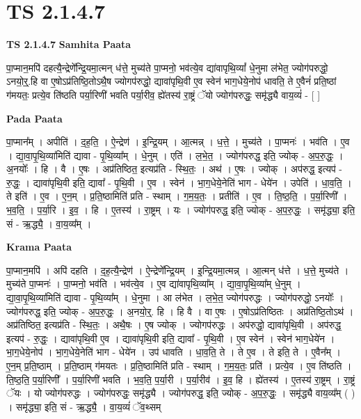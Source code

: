 \documentclass[17pt]{extarticle}
\begin{document}
\section*{ TS 2.1.4.7 }

\textbf{TS 2.1.4.7 } \newline
\textbf{Samhita Paata} \newline

पा॒प्मान॒मपि॑ दहत्यै॒न्द्रेणे᳚न्द्रि॒यमा॒त्मन् ध॑त्ते॒ मुच्य॑ते पा॒प्मनो॒ भव॑त्ये॒व द्या॑वापृथि॒व्यां᳚ धे॒नुमा ल॑भेत॒ ज्योग॑परुद्धो॒ ऽनयो॒र्॒॒.हि वा  ए॒षोऽप्र॑तिष्ठि॒तोऽथै॒ष ज्योगप॑रुद्धो॒ द्यावा॑पृथि॒वी ए॒व स्वेन॑ भाग॒धेये॒नोप॑ धावति॒ ते ए॒वैनं॑ प्रति॒ष्ठां ग॑मयतः॒ प्रत्ये॒व ति॑ष्ठति पर्या॒रिणी॑ भवति पर्या॒रीव॒ ह्ये॑तस्य॑ रा॒ष्ट्रं ॅयो ज्योग॑परुद्धः॒ समृ॑द्ध्यै वाय॒व्यं॑ - [  ] \newline

\textbf{Pada Paata} \newline

पा॒प्मान᳚म् । अपीति॑ । द॒ह॒ति॒ । ऐ॒न्द्रेण॑ । इ॒न्द्रि॒यम् । आ॒त्मन्न् । ध॒त्ते॒ । मुच्य॑ते । पा॒प्मनः॑ । भव॑ति । ए॒व । द्या॒वा॒पृ॒थि॒व्या॑मिति॑ द्यावा - पृ॒थि॒व्या᳚म् । धे॒नुम् । एति॑ । ल॒भे॒त॒ । ज्योग॑परुद्ध॒ इति॒ ज्योक् - अ॒प॒रु॒द्धः॒ । अ॒नयोः᳚ । हि । वै । ए॒षः । अप्र॑तिष्ठित॒ इत्यप्र॑ति - स्थि॒तः॒ । अथ॑ । ए॒षः । ज्योक् । अप॑रुद्ध॒ इत्यप॑ - रु॒द्धः॒ । द्यावा॑पृथि॒वी इति॒ द्यावा᳚ - पृ॒थि॒वी । ए॒व । स्वेन॑ । भा॒ग॒धेये॒नेति॑ भाग - धेये॑न । उपेति॑ । धा॒व॒ति॒ । ते इति॑ । ए॒व । ए॒न॒म् । प्र॒ति॒ष्ठामिति॑ प्रति - स्थाम् । ग॒म॒य॒तः॒ । प्रतीति॑ । ए॒व । ति॒ष्ठ॒ति॒ । प॒र्या॒रिणी᳚ । भ॒व॒ति॒ । प॒र्या॒रि । इ॒व॒ । हि । ए॒तस्य॑ । रा॒ष्ट्रम् । यः । ज्योग॑परुद्ध॒ इति॒ ज्योक् - अ॒प॒रु॒द्धः॒ । समृ॑द्ध्या॒ इति॒ सं - ऋ॒द्ध्यै॒ । वा॒य॒व्य᳚म् ।  \newline


\textbf{Krama Paata} \newline

पा॒प्मान॒मपि॑ । अपि॑ दहति । द॒ह॒त्यै॒न्द्रेण॑ । ऐ॒न्द्रेणे᳚न्द्रि॒यम् । इ॒न्द्रि॒यमा॒त्मन्न् । आ॒त्मन् ध॑त्ते । ध॒त्ते॒ मुच्य॑ते । मुच्य॑ते पा॒प्मनः॑ । पा॒प्मनो॒ भव॑ति । भव॑त्ये॒व । ए॒व द्या॑वापृथि॒व्या᳚म् । द्या॒वा॒पृ॒थि॒व्या᳚म् धे॒नुम् । द्या॒वा॒पृ॒थि॒व्या॑मिति॑ द्यावा - पृ॒थि॒व्या᳚म् । धे॒नुमा । आ ल॑भेत । ल॒भे॒त॒ ज्योग॑परुद्धः । ज्योग॑परुद्धो॒ ऽनयोः᳚ । ज्योग॑परुद्ध॒ इति॒ ज्योक् - अ॒प॒रु॒द्धः॒ । अ॒नयो॒र्॒. हि । हि वै । वा ए॒षः । ए॒षोऽप्र॑तिष्ठितः । अप्र॑तिष्ठि॒तोऽथ॑ । अप्र॑तिष्ठित॒ इत्यप्र॑ति - स्थि॒तः॒ । अथै॒षः । ए॒ष ज्योक् । ज्योगप॑रुद्धः । अप॑रुद्धो॒ द्यावा॑पृथि॒वी । अप॑रुद्ध॒ इत्यप॑ - रु॒द्धः॒ । द्यावा॑पृथि॒वी ए॒व । द्यावा॑पृथि॒वी इति॒ द्यावा᳚ - पृ॒थि॒वी । ए॒व स्वेन॑ । स्वेन॑ भाग॒धेये॑न । भा॒ग॒धेये॒नोप॑ । भा॒ग॒धेये॒नेति॑ भाग - धेये॑न । उप॑ धावति । धा॒व॒ति॒ ते । ते ए॒व । ते इति॒ ते । ए॒वैन᳚म् । ए॒न॒म् प्र॒ति॒ष्ठाम् । प्र॒ति॒ष्ठाम् ग॑मयतः । प्र॒ति॒ष्ठामिति॑ प्रति - स्थाम् । ग॒म॒य॒तः॒ प्रति॑ । प्रत्ये॒व । ए॒व ति॑ष्ठति । ति॒ष्ठ॒ति॒ प॒र्या॒रिणी᳚ । प॒र्या॒रिणी॑ भवति । भ॒व॒ति॒ प॒र्या॒री । प॒र्या॒रीव॑ । इ॒व॒ हि । ह्ये॑तस्य॑ । ए॒तस्य॑ रा॒ष्ट्रम् । रा॒ष्ट्रं ॅयः । यो ज्योग॑परुद्धः । ज्योग॑परुद्धः॒ समृ॑द्ध्यै । ज्योग॑परुद्ध॒ इति॒ ज्योक् - अ॒प॒रु॒द्धः॒ । समृ॑द्ध्यै वाय॒व्य᳚म् ( ) । समृ॑द्ध्या॒ इति॒ सं - ऋ॒द्ध्यै॒ । वा॒य॒व्यं॑ ॅव॒थ्सम् \newline
\end{document}
